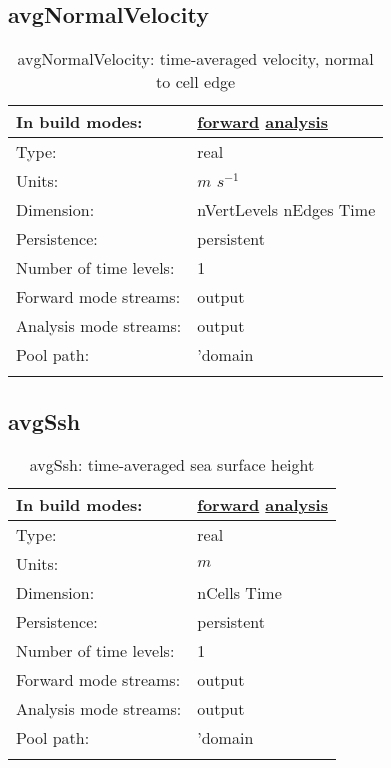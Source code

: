 \subsection[avgNormalVelocity]{avgNormalVelocity}
\label{subsec:var_sec_average_avgNormalVelocity}
\begin{center}
\begin{longtable}{| p{2.0in} | p{4.0in} |}
        \hline 
        In build modes: & \hyperref[subsec:forward_var_tab_average]{forward} \hyperref[subsec:analysis_var_tab_average]{analysis} \\
        \hline 
        Type: & real \\
        \hline 
        Units: & $m$ $s^{-1}$ \\
        \hline 
        Dimension: & nVertLevels nEdges Time \\
        \hline 
        Persistence: & persistent \\
        \hline 
        Number of time levels: & 1 \\
        \hline 
		 Forward mode streams: &  output \\
        \hline 
		 Analysis mode streams: &  output \\
        \hline 
            Pool path: & 'domain %
 \\
		 \hline 
    \caption{avgNormalVelocity: time-averaged velocity, normal to cell edge}
\end{longtable}
\end{center}
\subsection[avgSsh]{avgSsh}
\label{subsec:var_sec_average_avgSsh}
\begin{center}
\begin{longtable}{| p{2.0in} | p{4.0in} |}
        \hline 
        In build modes: & \hyperref[subsec:forward_var_tab_average]{forward} \hyperref[subsec:analysis_var_tab_average]{analysis} \\
        \hline 
        Type: & real \\
        \hline 
        Units: & $m$ \\
        \hline 
        Dimension: & nCells Time \\
        \hline 
        Persistence: & persistent \\
        \hline 
        Number of time levels: & 1 \\
        \hline 
		 Forward mode streams: &  output \\
        \hline 
		 Analysis mode streams: &  output \\
        \hline 
            Pool path: & 'domain %
 \\
		 \hline 
    \caption{avgSsh: time-averaged sea surface height}
\end{longtable}
\end{center}

